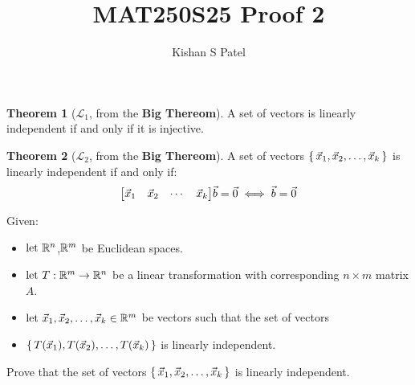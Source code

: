\documentclass{exam}
\theoremstyle{plain}
\theoremstyle{definition}
\newtheorem{theorem}{Theorem}
\begin{document}
\title{MAT250S25 Proof 2}
\author{Kishan S Patel}
\maketitle

\begin{theorem}[$\mathcal L_1$, from the \textbf{Big Thereom}\textsuperscript{\texttrademark}]
	A set of vectors is linearly independent if and only if it is injective.
\end{theorem}

\begin{theorem}[$\mathcal L_2$, from the \textbf{Big Thereom}\textsuperscript{\texttrademark}]
	A set of vectors $\set{\vec x_1, \vec x_2, \dots, \vec x_k}$ is linearly independent if and only if:
	$$
		{ \begin{bmatrix} \vec x_1 & \vec x_2 & \cdots & \vec x_k \end{bmatrix} }\vec b  = \vec 0 \iff \vec b = \vec 0
	$$
\end{theorem}

Given:
\begin{itemize}
	\item ${\text{let } } {\mathbb R}^n$,${\mathbb R}^m$ be Euclidean spaces.
	\item ${\text{let } } T:{\mathbb R}^m\to{\mathbb R}^ n$ be a linear transformation with corresponding $n\times m$ matrix $A$.
	\item ${\text{let } } \vec x_1, \vec x_2, \dots, \vec x_k \in {\mathbb R}^ m$ be vectors such that the set of vectors
	\item $\set{T(\vec x_1), T(\vec x_2), \dots, T(\vec x_k)}$ is linearly independent.
\end{itemize}

Prove that the set of vectors $\set{\vec x_1, \vec x_2, \dots, \vec x_k}$ is linearly independent.

\renewcommand\qedsymbol{QED}


\end{document}
